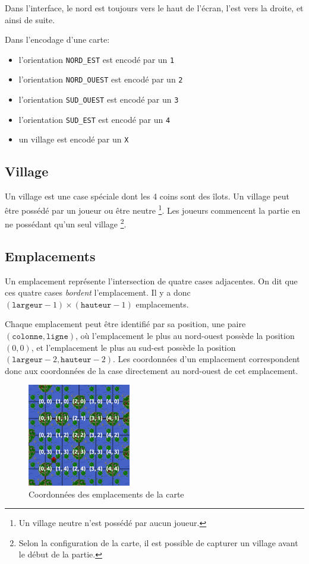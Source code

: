 \newpage
Dans l'interface, le nord est toujours vers le haut de l'écran, l'est vers la
droite, et ainsi de suite.

Dans l'encodage d'une carte:
\begin{itemize}
    \item
        l'orientation \texttt{NORD\_EST} est encodé par un \texttt{1}
    \item
        l'orientation \texttt{NORD\_OUEST} est encodé par un \texttt{2}
    \item
        l'orientation \texttt{SUD\_OUEST} est encodé par un \texttt{3}
    \item
        l'orientation \texttt{SUD\_EST} est encodé par un \texttt{4}
    \item
        un village est encodé par un \texttt{X}
\end{itemize}

\subsection{Village}
Un village est une case spéciale dont les 4 coins sont des îlots.
Un village peut être possédé par un joueur ou être neutre
\footnote{Un village neutre n'est possédé par aucun joueur.}.
Les joueurs commencent la partie en ne possédant qu'un seul village
\footnote{Selon la configuration de la carte, il est possible de capturer
un village avant le début de la partie.}.

\subsection{Emplacements}
Un emplacement représente l'intersection de quatre cases adjacentes.
On dit que ces quatre cases \emph{bordent} l'emplacement.
Il y a donc $(\mathtt{largeur} - 1) \times (\mathtt{hauteur} - 1)$ emplacements.

Chaque emplacement peut être identifié par sa position, une paire
$(\mathtt{colonne}, \mathtt{ligne})$, où l'emplacement le plus au nord-ouest
possède la position $(0, 0)$, et l'emplacement le plus au sud-est possède
la position $(\mathtt{largeur} - 2, \mathtt{hauteur} - 2)$.
Les coordonnées d'un emplacement correspondent donc aux coordonnées de la case
directement au nord-ouest de cet emplacement.

\begin{figure}[h]
    \centering
    \includegraphics[width=0.4\textwidth]{img/sprites/emplacements.png}
    \caption{Coordonnées des emplacements de la carte}
\end{figure}

